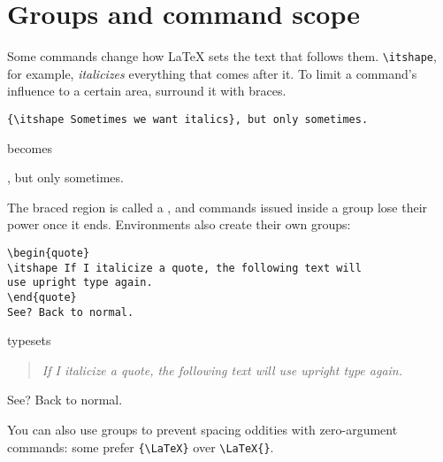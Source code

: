 \section{Groups and command scope}
Some commands change how \LaTeX{} sets the text that follows them.
\verb|\itshape|, for example, \textit{italicizes} everything that comes after it.
To limit a command's influence to a certain area, surround it with braces.
\begin{leftfigure}
\begin{lstlisting}
{\itshape Sometimes we want italics}, but only sometimes.
\end{lstlisting}
\end{leftfigure}
becomes
\begin{leftfigure}
, but only sometimes.
\end{leftfigure}
The braced region is called a ,
and commands issued inside a group lose their power once it ends.
Environments also create their own groups:
\begin{leftfigure}
\begin{lstlisting}
\begin{quote}
\itshape If I italicize a quote, the following text will
use upright type again.
\end{quote}
See? Back to normal.
\end{lstlisting}
\end{leftfigure}
typesets
\begin{leftfigure}
\lm
\begin{quote}
\itshape If I italicize a quote, the following text will
use upright type again.
\end{quote}
See? Back to normal.
\end{leftfigure}
You can also use groups to prevent spacing oddities with zero-argument
commands: some prefer \verb|{\LaTeX}| over \verb|\LaTeX{}|.
